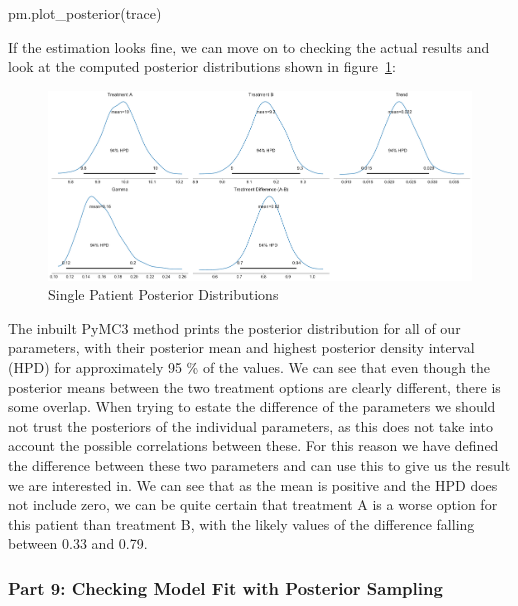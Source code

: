 \documentclass[12pt,a4paper,leqno]{report}
\theoremstyle{plain}
\theoremstyle{definition}
\theoremstyle{remark}
\begin{document}
\bigskip
\begin{pyverbatim}[][fontsize=\footnotesize]
    pm.plot_posterior(trace)
\end{pyverbatim}
\smallskip

If the estimation looks fine, we can move on to checking the actual results and look at
the computed posterior distributions shown in figure\ \ref{singlepatientposteriors}:

\bigskip
\begin{figure}[H]
    \caption{Single Patient Posterior Distributions}\label{singlepatientposteriors}
    \bigskip
    \includegraphics[width=\textwidth,height=\textheight,keepaspectratio]{single_patient_posteriors.pdf}
\end{figure}
\bigskip

The inbuilt PyMC3 method prints the posterior distribution for all of our parameters,
with their posterior mean and highest posterior density interval (HPD) for approximately
95 \% of the values. We can see that even though the posterior means between
the two treatment options are clearly different, there is some overlap. When
trying to estate the difference of the parameters we should not trust the posteriors of
the individual parameters, as this does not take into account the possible correlations
between these. For this reason we have defined the difference between these two
parameters and can use this to give us the result we are interested in. We can see
that as the mean is positive and the HPD does not include zero, we can be quite certain that
treatment A is a worse option for this patient than treatment B, with the likely values of
the difference falling between 0.33 and 0.79.


\subsubsection*{Part 9: Checking Model Fit with Posterior Sampling}
\end{document}
